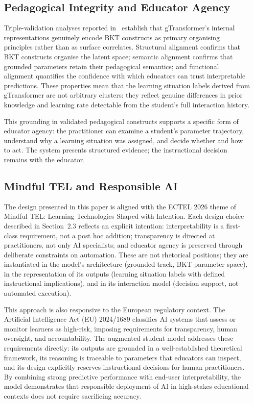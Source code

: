 \documentclass[runningheads]{llncs}
\begin{document}
\subsection{Pedagogical Integrity and Educator Agency}

Triple-validation analyses reported in~\cite{labra2026theory} establish that gTransformer's internal representations genuinely encode BKT constructs as primary organising principles rather than as surface correlates. Structural alignment confirms that BKT constructs organise the latent space; semantic alignment confirms that grounded parameters retain their pedagogical semantics; and functional alignment quantifies the confidence with which educators can trust interpretable predictions. These properties mean that the learning situation labels derived from gTransformer are not arbitrary clusters: they reflect genuine differences in prior knowledge and learning rate detectable from the student's full interaction history.

This grounding in validated pedagogical constructs supports a specific form of educator agency: the practitioner can examine a student's parameter trajectory, understand why a learning situation was assigned, and decide whether and how to act. The system presents structured evidence; the instructional decision remains with the educator.

\subsection{Mindful TEL and Responsible AI}

The design presented in this paper is aligned with the ECTEL 2026 theme of Mindful TEL: Learning Technologies Shaped with Intention. Each design choice described in Section~2.3 reflects an explicit intention: interpretability is a first-class requirement, not a post hoc addition; transparency is directed at practitioners, not only AI specialists; and educator agency is preserved through deliberate constraints on automation. These are not rhetorical positions; they are instantiated in the model's architecture (grounded track, BKT parameter space), in the representation of its outputs (learning situation labels with defined instructional implications), and in its interaction model (decision support, not automated execution).

This approach is also responsive to the European regulatory context. The Artificial Intelligence Act (EU) 2024/1689 classifies AI systems that assess or monitor learners as high-risk, imposing requirements for transparency, human oversight, and accountability. The augmented student model addresses these requirements directly: its outputs are grounded in a well-established theoretical framework, its reasoning is traceable to parameters that educators can inspect, and its design explicitly reserves instructional decisions for human practitioners. By combining strong predictive performance with end-user interpretability, the model demonstrates that responsible deployment of AI in high-stakes educational contexts does not require sacrificing accuracy.
\end{document}
